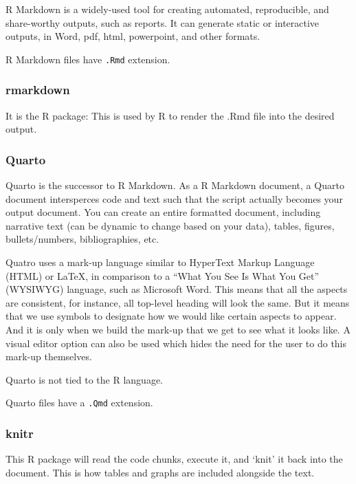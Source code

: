 \documentclass[
  letterpaper,
  DIV=11,
  numbers=noendperiod,
  oneside]{scrreprt}
\begin{document}
R Markdown is a widely-used tool for creating automated, reproducible,
and share-worthy outputs, such as reports. It can generate static or
interactive outputs, in Word, pdf, html, powerpoint, and other formats.

R Markdown files have \texttt{.Rmd} extension.

\hypertarget{rmarkdown}{%
\subsubsection{rmarkdown}\label{rmarkdown}}

It is the R package: This is used by R to render the .Rmd file into the
desired output.

\hypertarget{quarto}{%
\subsubsection{Quarto}\label{quarto}}

Quarto is the successor to R Markdown. As a R Markdown document, a
Quarto document intersperces code and text such that the script actually
becomes your output document. You can create an entire formatted
document, including narrative text (can be dynamic to change based on
your data), tables, figures, bullets/numbers, bibliographies, etc.

Quatro uses a mark-up language similar to HyperText Markup Language
(HTML) or LaTeX, in comparison to a ``What You See Is What You Get''
(WYSIWYG) language, such as Microsoft Word. This means that all the
aspects are consistent, for instance, all top-level heading will look
the same. But it means that we use symbols to designate how we would
like certain aspects to appear. And it is only when we build the mark-up
that we get to see what it looks like. A visual editor option can also
be used which hides the need for the user to do this mark-up themselves.

Quarto is not tied to the R language.

Quarto files have a \texttt{.Qmd} extension.

\hypertarget{knitr}{%
\subsubsection{knitr}\label{knitr}}

This R package will read the code chunks, execute it, and `knit' it back
into the document. This is how tables and graphs are included alongside
the text.
\end{document}
